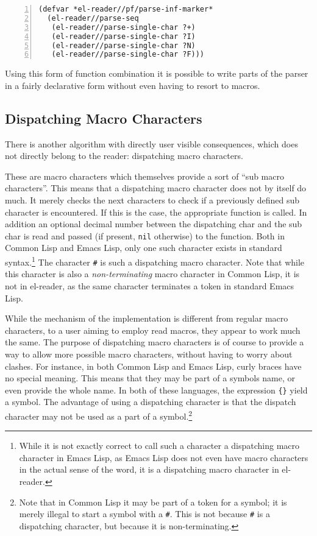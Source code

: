 \documentclass[a4paper,10pt,twoside]{report}
\newcommand{\el}{Emacs Lisp}
\newcommand{\cl}{Common Lisp}
\newcommand{\elr}{el-reader}
\newcommand{\sym}[1]{\texttt{#1}}
\newcommand{\nil}{\sym{nil}}
\begin{document}
\begin{lstlisting}[style=lispcode,label={code:parse-inf-marker},caption={Parse
    ``+INF''},numbers=left]
(defvar *el-reader//pf/parse-inf-marker*
  (el-reader//parse-seq
   (el-reader//parse-single-char ?+)
   (el-reader//parse-single-char ?I)
   (el-reader//parse-single-char ?N)
   (el-reader//parse-single-char ?F)))
\end{lstlisting}

Using this form of function combination it is possible to write parts of the
parser in a fairly declarative form without even having to resort to macros.

\subsection{Dispatching Macro Characters}
\label{subsec:dispatching-macro-chars}

There is another algorithm with directly user visible consequences, which does
not directly belong to the reader: dispatching macro characters.

These are macro characters which themselves provide a sort of ``sub macro
characters''.  This means that a dispatching macro character does not by itself
do much.  It merely checks the next characters to check if a previously defined
sub character is encountered.  If this is the case, the appropriate function is
called.  In addition an optional decimal number between the dispatching char and
the sub char is read and passed (if present, \nil{} otherwise) to the function.
Both in \cl{} and \el{}, only one such character exists in standard
syntax.\footnote{While it is not exactly correct to call such a character a
  dispatching macro character in \el{}, as \el{} does not even have macro
  characters in the actual sense of the word, it is a dispatching macro
  character in \elr{}.}  The character \texttt{\#} is such a dispatching macro
character.  Note that while this character is also a \emph{non-terminating}
macro character in \cl{}, it is not in \elr{}, as the same character terminates
a token in standard \el{}.

While the mechanism of the implementation is different from regular macro
characters, to a user aiming to employ read macros, they appear to work much the
same.  The purpose of dispatching macro characters is of course to provide a way
to allow more possible macro characters, without having to worry about clashes.
For instance, in both \cl{} and \el{}, curly braces have no special meaning.
This means that they may be part of a symbols name, or even provide the whole
name.  In both of these languages, the expression \texttt{\{\}} yield a symbol.
The advantage of using a dispatching character is that the dispatch
character may not be used as a part of a symbol.\footnote{Note that in \cl{} it
  may be part of a token for a symbol; it is merely illegal to start a symbol
  with a \texttt{\#}.  This is not because \texttt{\#} is a dispatching
  character, but because it is non-terminating.}
\end{document}
